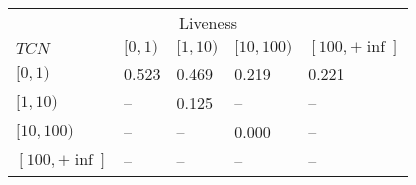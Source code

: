 

\begin{table}
\centering
\begin{tabular}{l|l|l|l|l} 
 & \multicolumn{3}{c}{Liveness} &  \\  
$TCN$ &         $[0,1)$ & $[1,10)$ & $[10,100)$ & $[100,+\inf]$ \\  \hline 
$[0,1)$ &       0.523   & 0.469    & 0.219      & 0.221 \\
$[1,10)$ &      --      & 0.125    & --         & --    \\
$[10,100)$ &    --      & --       & 0.000      & --    \\
$[100,+\inf]$ & --      & --       & --         & -- \\ 
\end{tabular}
\end{table}



